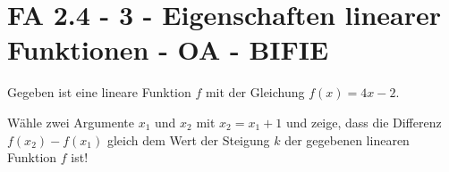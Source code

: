 \section{FA 2.4 - 3 - Eigenschaften linearer Funktionen - OA - BIFIE}

\begin{beispiel}[FA 2.4]{1} %
Gegeben ist eine lineare Funktion $f$ mit der Gleichung $f(x)=4x-2$.

Wähle zwei Argumente $x_1$ und $x_2$ mit $x_2=x_1+1$ und zeige, dass die Differenz $f(x_2)-f(x_1)$ gleich dem Wert der Steigung $k$ der gegebenen linearen Funktion $f$ ist!
\leer

\end{beispiel}